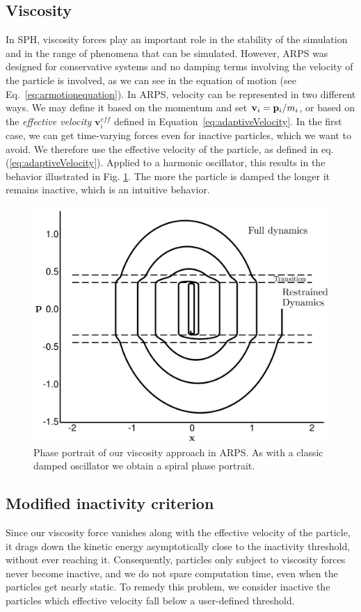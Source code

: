 \subsection{Viscosity}
In SPH, viscosity forces play an important role in the stability of the simulation and in the range of phenomena that can be simulated. 
However, ARPS was designed for conservative systems and no damping terms involving the velocity of the particle is involved, as we can see in the equation of motion (see Eq.~\ref{eq:armotionequation}).
In ARPS, velocity can be represented in two different ways.
We may define it based on the momentum and set $\mathbf{v}_{i} = \mathbf{p}_{i} / m_{i} $, or based on the \emph{effective velocity} $\mathbf{v}_{i}^{eff}$ defined in Equation~\ref{eq:adaptiveVelocity}.
In the first case, we can get time-varying forces even for inactive particles, which we want to avoid.
We therefore use the effective velocity of the particle, as defined in eq.(\ref{eq:adaptiveVelocity}).
Applied to a harmonic oscillator, this results in the behavior illustrated in Fig. \ref{fig:HODampedPP}.
The more the particle is damped the longer it remains inactive, which is an intuitive behavior.
\begin{figure}[htb]
  \centering
  \includegraphics[width=0.8\linewidth]{images/arps-vriphys2013/harmonicOscillatorDampedPhasePortraitraw_hacked.png}
  \caption[ARPS: Phase portrait of a damped ARPS harmonic oscillator]{\label{fig:HODampedPP} Phase portrait of our viscosity approach in ARPS.
  As with a classic damped oscillator we obtain a spiral phase portrait.}
\end{figure}
\subsection{Modified inactivity criterion}
Since our viscosity force vanishes along with the effective velocity of the particle, it drags down the kinetic energy asymptotically close to the inactivity threshold, without ever reaching it.
Consequently, particles only subject to viscosity forces never become inactive, and we do not spare computation time, even when the particles get nearly static.
To remedy this problem, we consider inactive the particles which effective velocity fall below a user-defined threshold.
